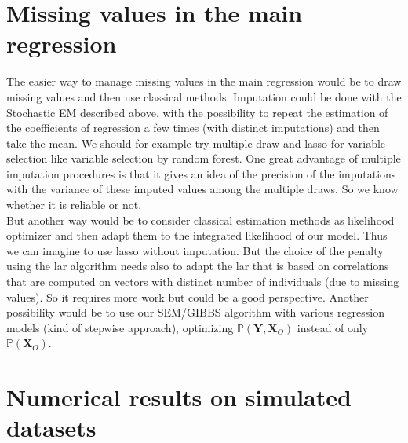 \documentclass[12pt,a4paper]{report}
\begin{document}
	\section{Missing values in the main regression}
		The easier way to manage missing values in the main regression would be to draw missing values and then use classical methods. Imputation could be done with the Stochastic EM described above, with the possibility to repeat the estimation of the coefficients of regression a few times (with distinct imputations) and then take the mean. We should for example try multiple draw and {\sc lasso} for variable selection like variable selection by random forest. One great advantage of multiple imputation procedures is that it gives an idea of the precision of the imputations with the variance of these imputed values among the multiple draws. So we know whether it is reliable or not. \\
		
		
				

		
		But another way would be to consider classical estimation methods as likelihood optimizer and then adapt them to the integrated likelihood of our model. Thus we can imagine to use {\sc lasso} without imputation. But the choice of the penalty using the {\sc lar} algorithm needs also to adapt the {\sc lar} that is based on correlations that are computed on vectors with distinct number of individuals (due to missing values). So it requires more work but could be a good perspective. Another possibility would be to use our SEM/GIBBS algorithm with various regression models (kind of stepwise approach), optimizing $\mathbb{P}(\boldsymbol{Y},\boldsymbol{X}_O)$ instead of only  $\mathbb{P}(\boldsymbol{X}_O)$.
	\section{Numerical results on simulated datasets}
\end{document}
